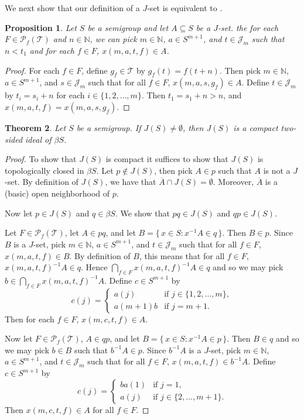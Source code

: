 \documentclass[12pt]{article}
\theoremstyle{plain}
\newtheorem{thm}{Theorem}[section]
\newtheorem{prop}[thm]{Proposition}
\theoremstyle{definition}
\newcommand{\bbN}{\mathbb{N}}
\newcommand{\calJ}{\mathcal{J}}
\newcommand{\calT}{\mathcal{T}}
\newcommand{\Pf}{\mathcal{P}_f}
\begin{document}
We next show that our definition of a $J$-set is equivalent to
\cite[Definition 3.3(e)]{De:2008uq}.

\begin{prop}
  Let $S$ be a semigroup and let $A \subseteq S$ be a $J$-set. 
  the for each $F \in \Pf(\calT)$ and $n \in \bbN$, we can pick $m \in
  \bbN$, $a \in S^{m+1}$, and $t \in \calJ_m$ such that $n < t_1$ and
  for each $f \in F$, $x(m, a, t, f) \in A$.
\end{prop}
\begin{proof}
  For each $f \in F$, define $g_f \in \calT$ by $g_f(t) = f(t + n)$. 
  Then pick $m \in \bbN$, $a \in S^{m+1}$, and $s \in \calJ_m$ such
  that for all $f \in F$, $x(m, a, s, g_f) \in A$. 
  Define $t \in \calJ_m$ by $t_i = s_i + n$ for each $i \in \{1, 2,
  \ldots, m\}$. 
  Then $t_1 = s_1 + n > n$, and $x(m, a, t, f) = x(m, a, s, g_f)$. 
\end{proof}

\begin{thm}
  Let $S$ be a semigroup. 
  If $J(S) \ne \emptyset$, then $J(S)$ is a compact two-sided ideal of
  $\beta S$. 
\end{thm}
\begin{proof}
  To show that $J(S)$ is compact it suffices to show that $J(S)$ is
  topologically closed in $\beta S$.
  Let $p \not\in J(S)$, then pick $A \in p$ such that $A$ is not a
  $J$-set. 
  By definition of $J(S)$, we have that $\overline{A} \cap J(S) =
  \emptyset$. 
  Moreover, $\overline{A}$ is a (basic) open neighborhood of $p$. 

  Now let $p \in J(S)$ and $q \in \beta S$. 
  We show that $pq \in J(S)$ and $qp \in J(S)$. 

  Let $F \in \Pf(\calT)$, let $A \in pq$, and let $B = \{\, x \in S :
  x^{-1}A \in q \,\}$. 
  Then $B \in p$. 
  Since $B$ is a $J$-set, pick $m \in \bbN$, $a \in S^{m+1}$, and $t
  \in \calJ_m$ such that for all $f \in F$, $x(m, a, t, f) \in B$. 
  By definition of $B$, this means that for all $f \in F$, $x(m, a, t,
  f)^{-1} A \in q$.
  Hence $\bigcap_{f \in F} x(m, a, t, f)^{-1} A \in q$ and so we may
  pick $b \in \bigcap_{f \in F} x(m, a, t, f)^{-1} A$.
  Define $c \in S^{m+1}$ by
  \[
    c(j) = 
    \begin{cases}
      a(j) & \mbox{if $j \in \{1, 2, \ldots, m\}$}, \\
      a(m+1)b & \mbox{if $j = m+1$}.
    \end{cases}
  \]
  Then for each $f \in F$, $x(m, c, t, f) \in A$. 

  Now let $F \in \Pf(\calT)$, $A \in qp$, and let $B = \{\, x \in S :
  x^{-1}A \in p \,\}$.
  Then $B \in q$ and so we may pick $b \in B$ such that $b^{-1}A \in
  p$. 
  Since $b^{-1}A$ is a $J$-set, pick $m \in \bbN$, $a \in S^{m+1}$,
  and $t \in \calJ_m$ such that for all $f \in F$, $x(m, a, t, f) \in
  b^{-1}A$. 
  Define $c \in S^{m+1}$ by
  \[
    c(j) = 
    \begin{cases}
      ba(1) & \mbox{if $j = 1$}, \\
      a(j) & \mbox{if $j \in \{2, \ldots, m+1\}$}.
    \end{cases}
  \]
  Then $x(m, c, t, f) \in A$ for all $f \in F$.
\end{proof}
\end{document}
